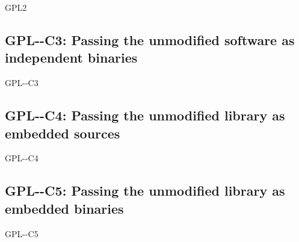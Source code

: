 \begin{license}{GPL2}
\subsection{GPL-\ver-C3: Passing the unmodified software as independent binaries} 
\begin{lsuc}{GPL-\ver-C3}

  \useCaseThree

  \begin{lsucrequires}
    \lsucmandatory{\keepLicenseElements}
    \lsucmandatory{\gpltwoEnsureCopyrightNoticeBinary}
    \lsucmandatory{\giveLicense}\passingFilesCorrectly  
    \lsucmandatory{\makeUnmodifiedSourceAvailable}
    \lsucmandatory{\describeHowToGetSource}
    \lsucmandatory{\retainCopyrightNotices}
    \lsucoptional{\addToDocumentation}
  \end{lsucrequires}

  \lsucprohibitsnothing
\end{lsuc}

\subsection{GPL-\ver-C4: Passing the unmodified library as embedded sources}
\begin{lsuc}{GPL-\ver-C4}

  \useCaseFour

  \begin{lsucrequires}
    \lsucmandatory{\keepLicenseElements}
    \lsucmandatory{\gpltwoEnsureCopyrightNoticeSource}
    \lsucmandatory{\giveLicense}\passingFilesCorrectly
    \lsucmandatory{\retainCopyrightNotices}
    \lsucmandatory{\addToCopyrightDialogLib}
    \lsucmandatory{\arrangeEnclosingSources}
    \lsucoptional{\addToDocumentation}
  \end{lsucrequires}

  \lsucprohibitsnothing
\end{lsuc}

\subsection{GPL-\ver-C5: Passing the unmodified library as embedded binaries} 
\begin{lsuc}{GPL-\ver-C5}


\end{lsuc}
\end{license}
